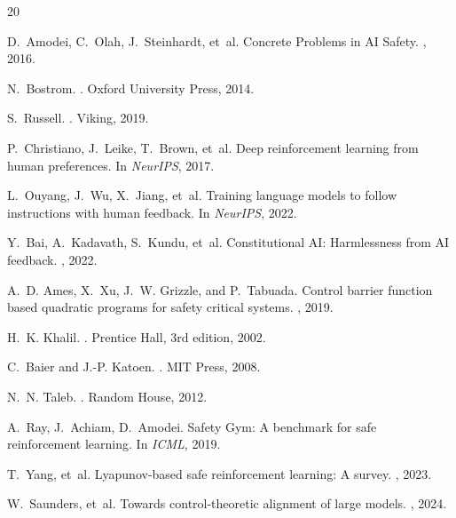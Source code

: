 \documentclass[11pt]{article}
\begin{document}

\begin{thebibliography}{20}

D.~Amodei, C.~Olah, J.~Steinhardt, et~al.
\newblock Concrete Problems in AI Safety.
, 2016.

N.~Bostrom.
.
\newblock Oxford University Press, 2014.

S.~Russell.
.
\newblock Viking, 2019.

P.~Christiano, J.~Leike, T.~Brown, et~al.
\newblock Deep reinforcement learning from human preferences.
\newblock In {\em NeurIPS}, 2017.

L.~Ouyang, J.~Wu, X.~Jiang, et~al.
\newblock Training language models to follow instructions with human feedback.
\newblock In {\em NeurIPS}, 2022.

Y.~Bai, A.~Kadavath, S.~Kundu, et~al.
\newblock Constitutional AI: Harmlessness from AI feedback.
, 2022.

A.~D. Ames, X.~Xu, J.~W. Grizzle, and P.~Tabuada.
\newblock Control barrier function based quadratic programs for safety critical systems.
, 2019.

H.~K. Khalil.
.
\newblock Prentice Hall, 3rd edition, 2002.

C.~Baier and J.-P. Katoen.
.
\newblock MIT Press, 2008.

N.~N. Taleb.
.
\newblock Random House, 2012.

A.~Ray, J.~Achiam, D.~Amodei.
\newblock Safety Gym: A benchmark for safe reinforcement learning.
\newblock In {\em ICML}, 2019.

T.~Yang, et~al.
\newblock Lyapunov-based safe reinforcement learning: A survey.
, 2023.

W.~Saunders, et~al.
\newblock Towards control-theoretic alignment of large models.
, 2024.


\end{thebibliography}
\end{document}

